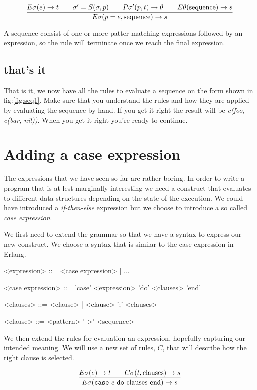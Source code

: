 \documentclass[a4paper,11pt]{article}
\begin{document}
$$\frac{   
  E\sigma(e) \rightarrow t
  \qquad \sigma' = S(\sigma, p)
  \qquad P\sigma'(p, t) \rightarrow \theta
  \qquad E\theta({\rm sequence}) \rightarrow s
}{E\sigma(p = e, {\rm sequence}) \rightarrow s}$$ 

A sequence consist of one or more patter matching expressions
followed by an expression, so the rule will terminate once we reach
the final expression.

\subsection{that's it}

That is it, we now have all the rules to evaluate a sequence on the
form shown in fig:\ref{fig:seq1}. Make sure that you understand
the rules and how they are applied by evaluating the sequence by
hand. If you get it right the result will be {\em c(foo, c(bar,
  nil))}. When you get it right you're ready to continue.


\section{Adding a case expression}

The expressions that we have seen so far are rather boring. In order to
write a program that is at lest marginally interesting we need a
construct that evaluates to different data structures depending on the
state of the execution. We could have introduced a {\em if-then-else}
expression but we choose to introduce a so called {\em case expression}.

We first need to extend the grammar so that we have a syntax to express
our new construct. We choose a syntax that is similar to the case
expression in Erlang.

\begin{grammar}
     <expression> ::=  <case expression> | ...  

     <case expression> ::= 'case' <expression> 'do' <clauses>  'end' 

     <clauses> ::=   <clause> | <clause> ';' <clauses>

     <clause> ::=  <pattern> '-\textgreater' <sequence>
\end{grammar}

We then extend the rules for evaluation an expression, hopefully
capturing our intended meaning. We will use a new set of rules, $C$,
that will describe how the right clause is selected. 


$$\frac{E\sigma(e) \rightarrow t \qquad C\sigma(t, {\rm clauses}) \rightarrow s }{E\sigma({\tt case}\ e \ {\tt do}\ {\rm clauses} \ {\tt end}) \rightarrow s}$$
\end{document}
